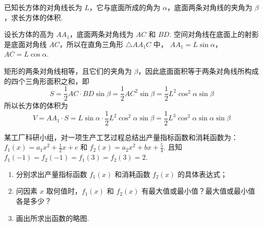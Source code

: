 \begin{problem}
已知长方体的对角线长为 \(L\)，它与底面所成的角为 \( \alpha \)，底面两条对角线的夹角为 \( \beta \)，求长方体的体积.

\end{problem}

\begin{solution}
设长方体的高为 \(AA_1\)，底面两条对角线为 \(AC\) 和 \(BD\). 空间对角线在底面上的射影是底面对角线 \(AC\)，所以在直角三角形 \(\triangle AA_1C\) 中，
\(AA_1=L\sin\alpha\)，\(AC=L\cos\alpha\).

矩形的两条对角线相等，且它们的夹角为 \(\beta\)，因此底面面积等于两条对角线所构成的四个三角形面积之和，即
\[
S=\frac12AC\cdot BD\sin\beta
=\frac12AC^2\sin\beta
=\frac12L^2\cos^2\alpha\sin\beta
\]
所以长方体的体积为
\[
V=AA_1\cdot S
=L\sin\alpha\cdot\frac12L^2\cos^2\alpha\sin\beta
=\frac12L^3\cos^2\alpha\sin\alpha\sin\beta
\]
\end{solution}

\begin{problem}
某工厂科研小组，对一项生产工艺过程总结出产量指标函数和消耗函数为：\( f_1(x)=a_1x^2+\frac{1}{2}x+c \) 和 \( f_2(x)=a_2x^2+bx+\frac{5}{4} \). 且知 \( f_1(-1)=f_2(-1)=f_1(3)=f_2(3)=2 \).

\begin{enumerate}
\item 分别求出产量指标函数 \( f_1(x) \) 和消耗函数 \( f_2(x) \) 的具体表达式；
\item 问因素 \( x \) 取何值时，\( f_1(x) \) 和 \( f_2(x) \) 有最大值或最小值？最大值或最小值各是多少？
\item 画出所求出函数的略图.
\end{enumerate}
\end{problem}

